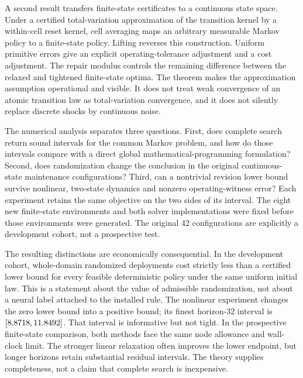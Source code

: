 A second result transfers finite-state certificates to a continuous state space. Under a certified total-variation approximation of the transition kernel by a within-cell reset kernel, cell averaging maps an arbitrary measurable Markov policy to a finite-state policy. Lifting reverses this construction. Uniform primitive errors give an explicit operating-tolerance adjustment and a cost adjustment. The repair modulus controls the remaining difference between the relaxed and tightened finite-state optima. The theorem makes the approximation assumption operational and visible. It does not treat weak convergence of an atomic transition law as total-variation convergence, and it does not silently replace discrete shocks by continuous noise.

The numerical analysis separates three questions. First, does complete search return sound intervals for the common Markov problem, and how do those intervals compare with a direct global mathematical-programming formulation? Second, does randomization change the conclusion in the original continuous-state maintenance configurations? Third, can a nontrivial revision lower bound survive nonlinear, two-state dynamics and nonzero operating-witness error? Each experiment retains the same objective on the two sides of its interval. The eight new finite-state environments and both solver implementations were fixed before those environments were generated. The original 42 configurations are explicitly a development cohort, not a prospective test.

The resulting distinctions are economically consequential. In the development cohort, \PrimaryStrict{} whole-domain randomized deployments cost strictly less than a certified lower bound for every feasible deterministic policy under the same uniform initial law. This is a statement about the value of admissible randomization, not about a neural label attached to the installed rule. The nonlinear experiment changes the zero lower bound into a positive bound; its finest horizon-32 interval is $[8.8718,11.8492]$. That interval is informative but not tight. In the prospective finite-state comparison, both methods face the same node allowance and wall-clock limit. The stronger linear relaxation often improves the lower endpoint, but longer horizons retain substantial residual intervals. The theory supplies completeness, not a claim that complete search is inexpensive.

